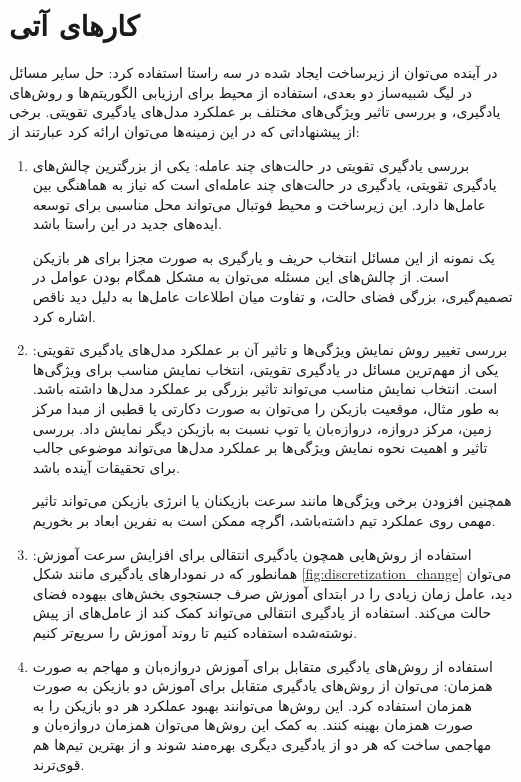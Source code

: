 \section{کار‌های آتی}
در آینده می‌توان از زیرساخت ایجاد شده در سه راستا استفاده کرد: حل سایر مسائل در لیگ شبیه‌ساز دو بعدی، استفاده از محیط برای ارزیابی الگوریتم‌ها و روش‌های یادگیری،
و بررسی تاثیر ویژگی‌های مختلف بر عملکرد مدل‌های یادگیری تقویتی.
برخی از پیشنهاداتی که در این زمینه‌ها می‌توان ارائه کرد عبارتند از:
\begin{enumerate}
    \item   بررسی یادگیری تقویتی در حالت‌های چند عامله: یکی از بزرگترین چالش‌های یادگیری تقویتی، یادگیری در حالت‌های چند عامله‌ای است که نیاز به هماهنگی بین عامل‌ها دارد. این زیرساخت و محیط فوتبال می‌تواند محل مناسبی برای توسعه ایده‌های جدید در این راستا باشد.

    یک نمونه از این مسائل انتخاب حریف و یارگیری به صورت مجزا برای هر بازیکن است. از چالش‌های این مسئله می‌توان به مشکل همگام بودن عوامل در تصمیم‌گیری، بزرگی فضای حالت، و تفاوت میان اطلاعات عامل‌ها به دلیل دید ناقص اشاره کرد.
    \item بررسی تغییر روش نمایش ویژگی‌ها و تاثیر آن بر عملکرد مدل‌های یادگیری تقویتی: یکی از مهم‌ترین مسائل در یادگیری تقویتی، انتخاب نمایش مناسب برای ویژگی‌ها است. انتخاب نمایش مناسب می‌تواند تاثیر بزرگی بر عملکرد مدل‌ها داشته باشد.
    به طور مثال، موقعیت بازیکن را می‌توان به صورت دکارتی یا قطبی از مبدا مرکز زمین، مرکز دروازه، دروازه‌بان یا توپ نسبت به بازیکن دیگر نمایش داد. بررسی تاثیر و اهمیت نحوه نمایش ویژگی‌ها بر عملکرد مدل‌ها می‌تواند موضوعی جالب برای تحقیقات آینده باشد.

    همچنین افزودن برخی ویژگی‌ها مانند سرعت بازیکنان یا انرژی بازیکن می‌تواند تاثیر مهمی روی عملکرد تیم داشته‌باشد، اگرچه ممکن است به نفرین ابعاد بر بخوریم.
    \item استفاده از روش‌هایی همچون یادگیری انتقالی برای افزایش سرعت آموزش:
    همانطور که در نمودار‌های یادگیری مانند شکل \ref{fig:discretization_change}
    می‌توان دید، عامل زمان زیادی را در ابتدای آموزش صرف جستجوی بخش‌های بیهوده فضای حالت می‌کند. استفاده از یادگیری انتقالی می‌تواند کمک کند از عامل‌های از پیش نوشته‌شده استفاده کنیم تا روند آموزش را سریع‌تر کنیم.
    \item استفاده از روش‌های یادگیری متقابل برای آموزش دروازه‌بان و مهاجم به صورت همزمان:
    می‌توان از روش‌های یادگیری متقابل برای آموزش دو بازیکن به صورت همزمان استفاده کرد. این روش‌ها می‌توانند بهبود عملکرد هر دو بازیکن را به صورت همزمان بهینه کنند.
    به کمک این روش‌ها می‌توان همزمان دروازه‌بان و مهاجمی ساخت که هر دو از یادگیری دیگری بهره‌مند شوند و از بهترین تیم‌ها هم قوی‌ترند.
\end{enumerate}